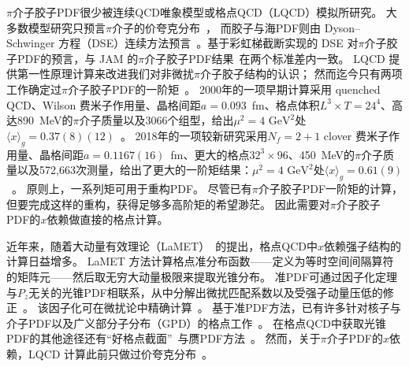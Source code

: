 $\pi$介子胶子PDF很少被连续QCD唯象模型或格点QCD（LQCD）模拟所研究。
大多数模型研究只预言$\pi$介子的价夸克分布~\cite{Nam:2012vm,Watanabe:2016lto,Watanabe:2017pvl,Hutauruk:2016sug,Lan:2019vui,Lan:2019rba,deTeramond:2018ecg,Watanabe:2019zny,Han:2018wsw,Chang:2014lva,Chang:2014gga,Chen:2016sno,Shi:2018mcb,Bednar:2018mtf,Ding:2019lwe}，
而胶子与海PDF则由 Dyson--Schwinger 方程（DSE）连续方法预言~\cite{Freese:2021zne}。基于彩虹梯截断实现的 DSE 对$\pi$介子胶子PDF的预言，与 JAM 的$\pi$介子胶子PDF结果~\cite{Barry:2018ort,Cao:2021aci}在两个标准差内一致。
LQCD 提供第一性原理计算来改进我们对非微扰$\pi$介子胶子结构的认识；
然而迄今只有两项工作确定过$\pi$介子胶子PDF的一阶矩~\cite{Meyer:2007tm,Shanahan:2018pib}。
2000年的一项早期计算采用 quenched QCD、Wilson 费米子作用量、晶格间距$a=0.093$~fm、格点体积$L^3\times T=24^4$、高达890~MeV的$\pi$介子质量以及3066个组型，给出$\mu^2=4\text{ GeV}^2$处$\langle x \rangle_g=0.37(8)(12)$~\cite{Meyer:2007tm}。
2018年的一项较新研究采用$N_f=2+1$ clover 费米子作用量、晶格间距$a=0.1167(16)$~fm、更大的格点$32^3\times 96$、450~MeV的$\pi$介子质量以及572{,}663次测量，给出了更大的一阶矩结果：$\mu^2=4\text{ GeV}^2$处$\langle x \rangle_g=0.61(9)$~\cite{Shanahan:2018pib}。
%
原则上，一系列矩可用于重构PDF。
尽管已有$\pi$介子胶子PDF一阶矩的计算，但要完成这样的重构，获得足够多高阶矩的希望渺茫。
因此需要对$\pi$介子胶子PDF的$x$依赖做直接的格点计算。

近年来，随着大动量有效理论（LaMET）~\cite{Ji:2013dva,Ji:2014gla,Ji:2017rah}的提出，格点QCD中$x$依赖强子结构的计算日益增多。
LaMET 方法计算格点准分布函数——定义为等时空间间隔算符的矩阵元——然后取无穷大动量极限来提取光锥分布。
准PDF可通过因子化定理与$P_z$无关的光锥PDF相联系，从中分解出微扰匹配系数以及受强子动量压低的修正~\cite{Ji:2014gla}。
该因子化可在微扰论中精确计算~\cite{Ma:2017pxb,Liu:2019urm}。
基于准PDF方法，已有许多针对核子与介子PDF以及广义部分子分布（GPD）的格点工作~\cite{Lin:2013yra,Lin:2014zya,Chen:2016utp,Lin:2017ani,Alexandrou:2015rja,Alexandrou:2016jqi,Alexandrou:2017huk,Chen:2017mzz,Alexandrou:2018pbm,Chen:2018xof,Chen:2018fwa,Alexandrou:2018eet,Lin:2018qky,Fan:2018dxu,Liu:2018hxv,Wang:2019tgg,Lin:2019ocg,Chen:2019lcm,Lin:2020reh,Chai:2020nxw,Bhattacharya:2020cen,Lin:2020ssv,Zhang:2020dkn,Li:2020xml,Fan:2020nzz,Gao:2020ito,Lin:2020fsj,Zhang:2020rsx,Alexandrou:2020qtt,Alexandrou:2020zbe,Lin:2020rxa,Gao:2021hxl,Lin:2020rut}。
在格点QCD中获取光锥PDF的其他途径还有``好格点截面''~\cite{Ma:2017pxb,Bali:2017gfr,Bali:2018spj,Sufian:2019bol,Sufian:2020vzb}与赝PDF方法~\cite{Orginos:2017kos,Karpie:2017bzm,Karpie:2018zaz,Karpie:2019eiq,Joo:2019jct,Joo:2019bzr,Radyushkin:2018cvn,Zhang:2018ggy,Izubuchi:2018srq,Joo:2020spy,Bhat:2020ktg,Fan:2020cpa,Sufian:2020wcv,Karthik:2021qwz}。
然而，关于$\pi$介子PDF的$x$依赖，LQCD 计算此前只做过价夸克分布~\cite{Chen:2018fwa,Sufian:2019bol,Izubuchi:2019lyk,Joo:2019bzr,Sufian:2020vzb,Shugert:2020tgq,Gao:2020ito}。

